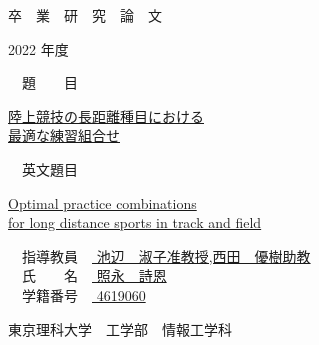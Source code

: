 \documentclass[12pt,fleqn]{jreport}
\begin{document}
\thispagestyle{empty}
\begin{center}
  {\Huge 卒　業　研　究　論　文}
\end{center}
\vspace{2cm}
\begin{center}
  {\huge 2022 年度}
\end{center}
\vspace{2cm}
\begin{flushleft}
  {\LARGE　題　　目　}
\end{flushleft}
\begin{center}
  {\LARGE \underline{陸上競技の長距離種目における}\\
    \vspace{0.2cm}
    \underline{最適な練習組合せ}}\\
\end{center}
\vspace{0.5cm}
\begin{flushleft}
  {\LARGE　英文題目　}
\end{flushleft}
\begin{center}
  {\LARGE \underline{Optimal practice combinations }\\
    \vspace{0.2cm}
    \underline{for long distance sports in track and field}
  }\\
\end{center}
\vspace{3cm}
\begin{flushleft}
  {\Large　指導教員　\underline{ 池辺　淑子准教授,西田　優樹助教 }}\\
  \vspace{5mm}
  {\Large　氏　　名　\underline{ 照永　詩恩  }}\\
  \vspace{5mm}
  {\Large　学籍番号　\underline{ 4619060 }}
\end{flushleft}
\vspace{1.5cm}
\begin{flushright}
  {\Large 東京理科大学　工学部　情報工学科}\\
\end{flushright}
\newpage
\thispagestyle{empty}
\end{document}
